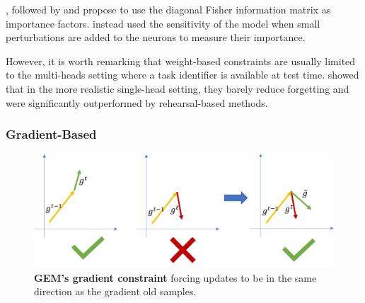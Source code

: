 \cite{kirkpatrick2017ewc}, followed by
\cite{zenke2017synaptic_intelligence} and \cite{chaudhry2018riemannien_walk}
propose to use the diagonal Fisher information matrix as importance factors.
\cite{aljundi2018MemoryAwareSynapses} instead used the sensitivity of the model when
small perturbations are added to the neurons to measure their importance.

However, it is worth remarking that weight-based constraints are usually limited to the multi-heads
setting where a task identifier is available at test time. \cite{lesort2019regulshortcomings} showed
that in the more realistic single-head setting, they barely reduce forgetting and were significantly
outperformed by rehearsal-based methods.

\subsubsection{Gradient-Based}
\label{sec:related_regul_gradient}

\begin{figure}[tb]
      \begin{center}
            \includegraphics[width=1.0\linewidth]{images/related/gem.pdf}
      \end{center}
      \caption{\textbf{GEM's gradient constraint} forcing updates to be in the same direction as the
            gradient \wrt old samples.}
      \label{fig:related_gem}
\end{figure}

